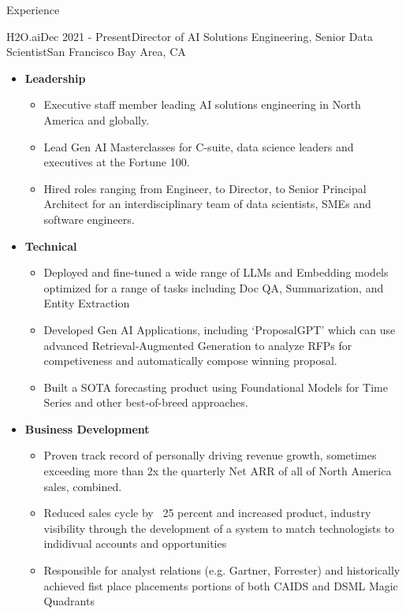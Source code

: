 \documentclass{resume} %
\begin{document}

\begin{rSection}{Experience}
\begin{rSubsection}{H2O.ai}{Dec 2021 - Present}{Director of AI Solutions Engineering, Senior Data Scientist}{San Francisco Bay Area, CA}

\begin{itemize}
	\item {\bf Leadership}
		\begin{itemize}
		\item Executive staff member leading AI solutions engineering in North America and globally.
		\item Lead Gen AI Masterclasses for C-suite, data science leaders and executives at the Fortune 100.
		\item Hired roles ranging from Engineer, to Director, to Senior Principal Architect for an interdisciplinary team of data scientists, SMEs and software engineers.
		\end{itemize}
	\item {\bf Technical}
		\begin{itemize}
		\item Deployed and fine-tuned a wide range of LLMs and Embedding models optimized for a range of tasks including Doc QA, Summarization, and Entity Extraction
		\item Developed Gen AI Applications, including `ProposalGPT' which can use advanced Retrieval-Augmented Generation to analyze RFPs for competiveness and automatically compose winning proposal.
		\item Built a SOTA forecasting product using Foundational Models for Time Series and other best-of-breed approaches.
		\end{itemize}
	\item {\bf Business Development}
		\begin{itemize}
		\item Proven track record of personally driving revenue growth, sometimes exceeding more than 2x the quarterly Net ARR of all of North America sales, combined.
		\item Reduced sales cycle by ~25 percent and increased product, industry visibility through the development of a system to match technologists to indidivual accounts and opportunities
		\item Responsible for analyst relations (e.g. Gartner, Forrester) and historically achieved fist place placements portions of both CAIDS and DSML Magic Quadrants
		\end{itemize}


\end{itemize}
\end{rSubsection}
\end{rSection}
\end{document}
